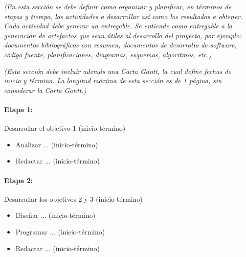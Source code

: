 \emph{(En esta sección se debe definir como organizar y planificar, en términos de etapas y tiempo, las actividades a desarrollar así como los resultados a obtener.  Cada actividad debe generar un entregable. Se entiende como entregable a la generación de artefactos que sean útiles al desarrollo del proyecto, por ejemplo: documentos bibliográficos con resumen, documentos de desarrollo de software, código fuente, planificaciones, diagramas, esquemas, algoritmos, etc.)}

\emph{(Esta sección debe incluir además una Carta Gantt, la cual define fechas de inicio y término. La longitud máxima de esta sección es de 1 página, sin considerar la Carta Gantt.)}

\paragraph{Etapa 1:} Desarrollar el objetivo 1 (inicio-término)
\begin{itemize}
\item Analizar ... (inicio-término)
\item Redactar ... (inicio-término)
\end{itemize}

\paragraph{Etapa 2:} Desarrollar los objetivos 2 y 3 (inicio-término)
\begin{itemize}
\item Diseñar ... (inicio-término)
\item Programar ... (inicio-término)
\item Redactar ... (inicio-término)
\end{itemize}